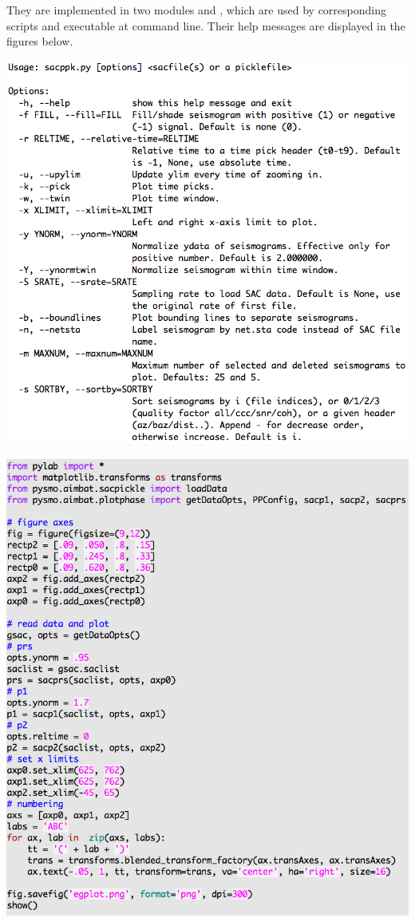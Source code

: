 \documentclass[letterpaper,10pt,english]{sphinxmanual}
\begin{document}
They are implemented in two modules  and , which are used by corresponding scripts  and  executable at command line. Their help messages are displayed in the figures below.

\includegraphics{help-sacppk.png}

\includegraphics{prog-egplot.png}
\end{document}
